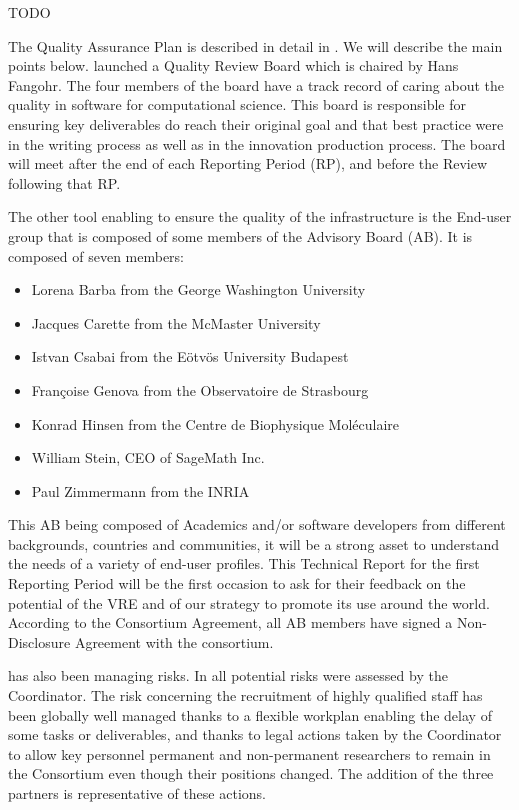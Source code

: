 \documentclass{deliverablereport}
\begin{document}
TODO

The Quality Assurance Plan is described in detail in . We will describe the main points below.
 launched a Quality Review Board which is chaired by Hans Fangohr. The four members of the board have a track record of caring about the quality in software for computational science. This board is responsible for ensuring key deliverables do reach their original goal and that best practice were in the writing process as well as in the innovation production process.
The board will meet after the end of each Reporting Period (RP), and before the Review following that RP.

The other tool enabling \ODK to ensure the quality of the infrastructure is the End-user group that is composed of some members of the Advisory Board (AB). It is composed of seven members:

\begin{itemize}
\item{Lorena Barba from the George Washington University}
\item{Jacques Carette from the McMaster University}
\item{Istvan Csabai from the Eötvös University Budapest}
\item{Françoise Genova from the Observatoire de Strasbourg}
\item{Konrad Hinsen from the Centre de Biophysique Moléculaire}
\item{William Stein, CEO of SageMath Inc.}
\item{Paul Zimmermann from the INRIA}
\end{itemize}

This AB being composed of Academics and/or software developers from different backgrounds, countries and communities, it will be a strong asset to understand the needs of a variety of end-user profiles. This Technical Report for the first Reporting Period will be the first occasion to ask for their feedback on the potential of the VRE and of our strategy to promote its use around the world.
According to the Consortium Agreement, all AB members have signed a Non-Disclosure Agreement with the consortium.

 has also been managing risks. In  all potential risks were assessed by the Coordinator. The risk concerning the recruitment of highly qualified staff has been globally well managed thanks to a flexible workplan enabling the delay of some tasks or deliverables, and thanks to legal actions taken by the Coordinator to allow key personnel permanent and non-permanent researchers to remain in the Consortium even though their positions changed. The addition of the three partners is representative of these actions.
\end{document}
